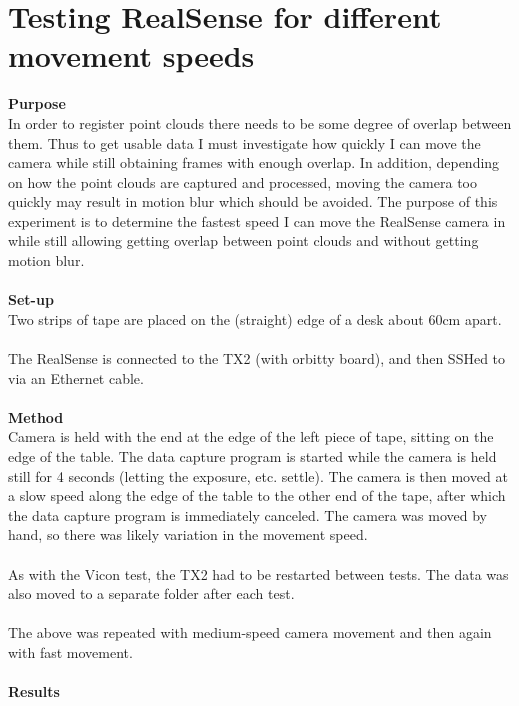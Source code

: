 \documentclass[12pt,a4paper]{article}
\begin{document}
\section{Testing RealSense for different movement speeds}
\textbf{Purpose} \\
In order to register point clouds there needs to be some degree of overlap between them. Thus to get usable data I must investigate how quickly I can move the camera while still obtaining frames with enough overlap. In addition, depending on how the point clouds are captured and processed, moving the camera too quickly may result in motion blur which should be avoided. The purpose of this experiment is to determine the fastest speed I can move the RealSense camera in while still allowing getting overlap between point clouds and without getting motion blur.
\\\\
\textbf{Set-up} \\
Two strips of tape are placed on the (straight) edge of a desk about 60cm apart.
\\\\
The RealSense is connected to the TX2 (with orbitty board), and then SSHed to via an Ethernet cable. 
\\\\
\textbf{Method} \\
Camera is held with the end at the edge of the left piece of tape, sitting on the edge of the table. The data capture program is started while the camera is held still for 4 seconds (letting the exposure, etc. settle). The camera is then moved at a slow speed along the edge of the table to the other end of the tape, after which the data capture program is immediately canceled. The camera was moved by hand, so there was likely variation in the movement speed.
\\\\
As with the Vicon test, the TX2 had to be restarted between tests. The data was also moved to a separate folder after each test.
\\\\
The above was repeated with medium-speed camera movement and then again with fast movement.
\\\\
\textbf{Results} \\
\end{document}

